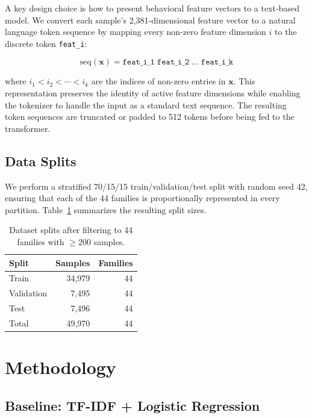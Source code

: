 \documentclass[11pt]{article}
\begin{document}
A key design choice is how to present behavioral feature vectors to a
text-based model. We convert each sample's 2,381-dimensional feature
vector to a natural language token sequence by mapping every non-zero
feature dimension $i$ to the discrete token \texttt{feat\_i}:

\begin{equation}
  \text{seq}(\mathbf{x}) = \texttt{feat\_{i\_1}}\;\texttt{feat\_{i\_2}}\;\ldots\;\texttt{feat\_{i\_k}}
\end{equation}

where $i_1 < i_2 < \cdots < i_k$ are the indices of non-zero entries
in $\mathbf{x}$. This representation preserves the identity of active
feature dimensions while enabling the tokenizer to handle the input as
a standard text sequence. The resulting token sequences are truncated
or padded to 512 tokens before being fed to the transformer.

\subsection{Data Splits}

We perform a stratified 70/15/15 train/validation/test split with
random seed 42, ensuring that each of the 44 families is proportionally
represented in every partition. Table~\ref{tab:data} summarizes the
resulting split sizes.

\begin{table}[h]
\centering
\small
\begin{tabular}{lrr}
\toprule
\textbf{Split} & \textbf{Samples} & \textbf{Families} \\
\midrule
Train      & 34,979 & 44 \\
Validation &  7,495 & 44 \\
Test       &  7,496 & 44 \\
\midrule
Total      & 49,970 & 44 \\
\bottomrule
\end{tabular}
\caption{Dataset splits after filtering to 44 families with $\geq$200 samples.}
\label{tab:data}
\end{table}

\section{Methodology}
\label{sec:method}

\subsection{Baseline: TF-IDF + Logistic Regression}
\end{document}
